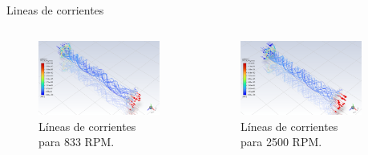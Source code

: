 \begin{frame}{Lineas de corrientes}
    \begin{columns}
        \begin{block}{}
        \begin{figure}[ht!]
            \centering
            \includegraphics[width=\linewidth]{dump/cor1.png}
            \caption{Líneas de corrientes para 833 RPM.}
        \end{figure}
    \end{block}
        \begin{block}{}
        \begin{figure}[ht!]
            \centering
            \includegraphics[width=\linewidth]{dump/cor2.png}
            \caption{Líneas de corrientes para 2500 RPM.}
        \end{figure}
    \end{block}
        \begin{block}{}

\end{block}
\end{columns}
\end{frame}
